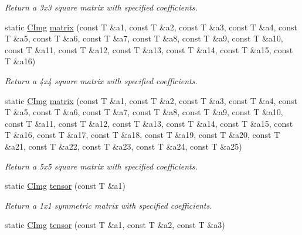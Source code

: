 \begin{DoxyCompactItemize}
\begin{DoxyCompactList}\small\item\em Return a 3x3 square matrix with specified coefficients. \item\end{DoxyCompactList}\item 
\hypertarget{structcimg__library_1_1_c_img_ad8161efcd135160828b158b59eb713e3}{
static \hyperlink{structcimg__library_1_1_c_img}{CImg} \hyperlink{structcimg__library_1_1_c_img_ad8161efcd135160828b158b59eb713e3}{matrix} (const T \&a1, const T \&a2, const T \&a3, const T \&a4, const T \&a5, const T \&a6, const T \&a7, const T \&a8, const T \&a9, const T \&a10, const T \&a11, const T \&a12, const T \&a13, const T \&a14, const T \&a15, const T \&a16)}
\label{structcimg__library_1_1_c_img_ad8161efcd135160828b158b59eb713e3}

\begin{DoxyCompactList}\small\item\em Return a 4x4 square matrix with specified coefficients. \item\end{DoxyCompactList}\item 
\hypertarget{structcimg__library_1_1_c_img_a281b4822b262369a59c6f6c667339e35}{
static \hyperlink{structcimg__library_1_1_c_img}{CImg} \hyperlink{structcimg__library_1_1_c_img_a281b4822b262369a59c6f6c667339e35}{matrix} (const T \&a1, const T \&a2, const T \&a3, const T \&a4, const T \&a5, const T \&a6, const T \&a7, const T \&a8, const T \&a9, const T \&a10, const T \&a11, const T \&a12, const T \&a13, const T \&a14, const T \&a15, const T \&a16, const T \&a17, const T \&a18, const T \&a19, const T \&a20, const T \&a21, const T \&a22, const T \&a23, const T \&a24, const T \&a25)}
\label{structcimg__library_1_1_c_img_a281b4822b262369a59c6f6c667339e35}

\begin{DoxyCompactList}\small\item\em Return a 5x5 square matrix with specified coefficients. \item\end{DoxyCompactList}\item 
\hypertarget{structcimg__library_1_1_c_img_a40bd4344f4a7aae588ef5bfa4f8861d1}{
static \hyperlink{structcimg__library_1_1_c_img}{CImg} \hyperlink{structcimg__library_1_1_c_img_a40bd4344f4a7aae588ef5bfa4f8861d1}{tensor} (const T \&a1)}
\label{structcimg__library_1_1_c_img_a40bd4344f4a7aae588ef5bfa4f8861d1}

\begin{DoxyCompactList}\small\item\em Return a 1x1 symmetric matrix with specified coefficients. \item\end{DoxyCompactList}\item 
\hypertarget{structcimg__library_1_1_c_img_ae9f5322a5c23eba78071a3a1ebccbd2c}{
static \hyperlink{structcimg__library_1_1_c_img}{CImg} \hyperlink{structcimg__library_1_1_c_img_ae9f5322a5c23eba78071a3a1ebccbd2c}{tensor} (const T \&a1, const T \&a2, const T \&a3)}
\label{structcimg__library_1_1_c_img_ae9f5322a5c23eba78071a3a1ebccbd2c}


\end{DoxyCompactItemize}

